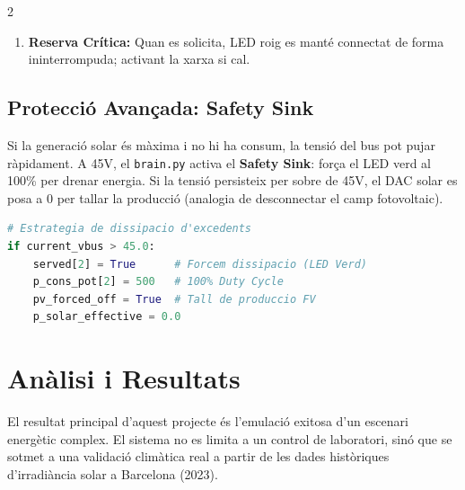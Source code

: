 \documentclass[11pt,a4paper]{article}
\begin{document}
\begin{multicols}{2}
\begin{enumerate}
              \begin{lstlisting}[language=Python]
# Sequencia de desconnexio (Load Shedding)
if current_vbus < 38.0: served[2] = False # Shed Verd
if current_vbus < 36.0: served[1] = False # Shed Blau
\end{lstlisting}

        \item \textbf{Reserva Crítica:} Quan es solicita, LED roig es manté connectat de forma ininterrompuda; activant la xarxa si cal.
    \end{enumerate}



    \subsection{Protecció Avançada: Safety Sink}
    Si la generació solar és màxima i no hi ha consum, la tensió del bus pot pujar ràpidament. A 45V, el \texttt{brain.py} activa el \textbf{Safety Sink}: força el LED verd al 100\% per drenar energia. Si la tensió persisteix per sobre de 45V, el DAC solar es posa a 0 per tallar la producció (analogia de desconnectar el camp fotovoltaic).

    \begin{lstlisting}[language=Python]
# Estrategia de dissipacio d'excedents
if current_vbus > 45.0:
    served[2] = True      # Forcem dissipacio (LED Verd)
    p_cons_pot[2] = 500   # 100% Duty Cycle
    pv_forced_off = True  # Tall de produccio FV
    p_solar_effective = 0.0 
\end{lstlisting}


    \section{Anàlisi i Resultats}
    El resultat principal d'aquest projecte és l'emulació exitosa d'un escenari energètic complex. El sistema no es limita a un control de laboratori, sinó que se sotmet a una validació climàtica real a partir de les dades històriques d'irradiància solar a Barcelona (2023).


\end{multicols}
\end{document}
